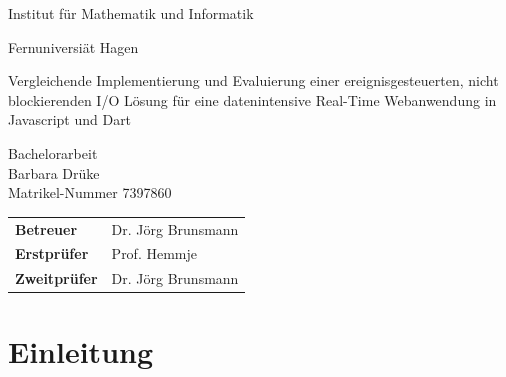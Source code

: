 
\pagestyle{empty}

\clearscrheadings\clearscrplain

\begin{center}
\begin{Huge}
Institut für Mathematik und Informatik\\
\vspace{3mm}
\end{Huge}{\Large Fernuniversiät Hagen}\\

\vspace{20mm}
\begin{Large}
Vergleichende Implementierung und Evaluierung einer ereignisgesteuerten, nicht
blockierenden I/O Lösung für eine datenintensive Real-Time Webanwendung in Javascript
und Dart\\
\end{Large}
\vspace{8mm}
Bachelorarbeit\\
\vspace{0.4cm}
\vspace{2 cm}
Barbara Drüke \\
Matrikel-Nummer 7397860\\
\vspace{5cm}
\begin{tabular}{ll}
{\bf Betreuer} & Dr. Jörg Brunsmann\\
{\bf Erstprüfer}&Prof. Hemmje\\
{\bf Zweitprüfer}&Dr. Jörg Brunsmann\\
\end{tabular}

\end{center}
\clearpage


\pagestyle{useheadings} %

\tableofcontents
\listoffigures
\listoftables





\chapter{Einleitung}

